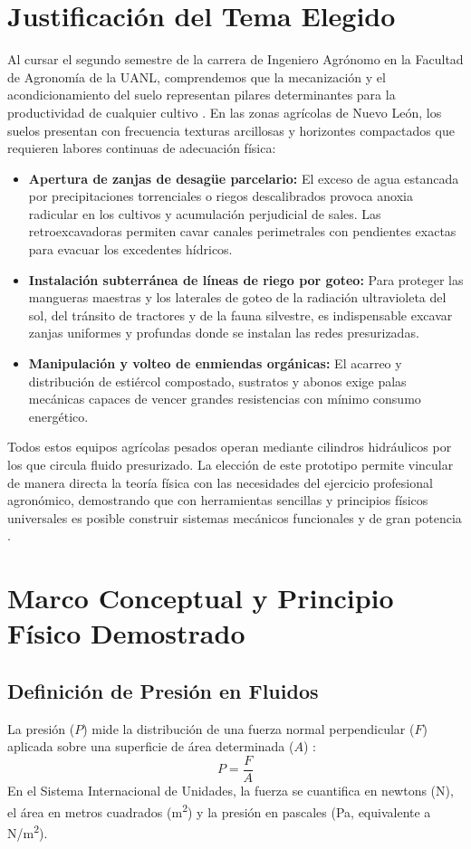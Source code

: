 \section{Justificación del Tema Elegido}
Al cursar el segundo semestre de la carrera de Ingeniero Agrónomo en la Facultad de Agronomía de la UANL, comprendemos que la mecanización y el acondicionamiento del suelo representan pilares determinantes para la productividad de cualquier cultivo \parencite{ortiz2003}. En las zonas agrícolas de Nuevo León, los suelos presentan con frecuencia texturas arcillosas y horizontes compactados que requieren labores continuas de adecuación física:
\begin{itemize}
    \item \textbf{Apertura de zanjas de desagüe parcelario:} El exceso de agua estancada por precipitaciones torrenciales o riegos descalibrados provoca anoxia radicular en los cultivos y acumulación perjudicial de sales. Las retroexcavadoras permiten cavar canales perimetrales con pendientes exactas para evacuar los excedentes hídricos.
    \item \textbf{Instalación subterránea de líneas de riego por goteo:} Para proteger las mangueras maestras y los laterales de goteo de la radiación ultravioleta del sol, del tránsito de tractores y de la fauna silvestre, es indispensable excavar zanjas uniformes y profundas donde se instalan las redes presurizadas.
    \item \textbf{Manipulación y volteo de enmiendas orgánicas:} El acarreo y distribución de estiércol compostado, sustratos y abonos exige palas mecánicas capaces de vencer grandes resistencias con mínimo consumo energético.
\end{itemize}

Todos estos equipos agrícolas pesados operan mediante cilindros hidráulicos por los que circula fluido presurizado. La elección de este prototipo permite vincular de manera directa la teoría física con las necesidades del ejercicio profesional agronómico, demostrando que con herramientas sencillas y principios físicos universales es posible construir sistemas mecánicos funcionales y de gran potencia \parencite{serway2018}.

\section{Marco Conceptual y Principio Físico Demostrado}
\subsection{Definición de Presión en Fluidos}
La presión ($P$) mide la distribución de una fuerza normal perpendicular ($F$) aplicada sobre una superficie de área determinada ($A$) \parencite{tippens2011}:
\begin{equation}
    P = \frac{F}{A}
\end{equation}
En el Sistema Internacional de Unidades, la fuerza se cuantifica en newtons (\unit{N}), el área en metros cuadrados (\unit{m^2}) y la presión en pascales (\unit{Pa}, equivalente a \unit{N/m^2}).

